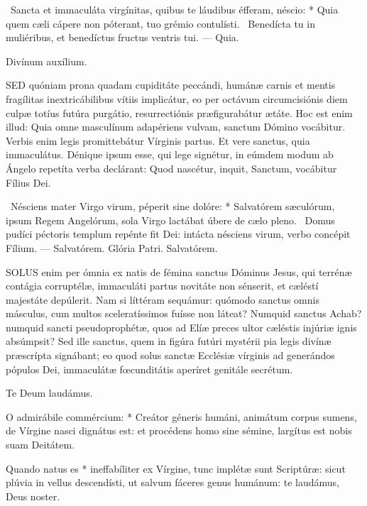 \R\ Sancta et immaculáta virgínitas, quibus te láudibus éfferam, néscio: * Quia quem cæli cápere non póterant, tuo grémio contulísti. \V\ Benedícta tu in muliéribus, et benedíctus fructus ventris tui. --- Quia.

 Divínum auxílium.


\lettrine[lines=2]{S}{ED} quóniam prona quadam cupiditáte peccándi, humánæ carnis et mentis fragílitas inextricábilibus vítiis implicátur, eo per octávum circumcisiónis diem culpæ totíus futúra purgátio, resurrectiónis præfigurabátur ætáte. Hoc est enim illud: Quia omne masculínum adapériens vulvam, sanctum Dómino vocábitur. Verbis enim legis promittebátur Vírginis partus. Et vere sanctus, quia immaculátus. Dénique ipsum esse, qui lege signétur, in eúmdem modum ab Ángelo repetíta verba declárant: Quod nascétur, inquit, Sanctum, vocábitur Fílius Dei.

\R\ Nésciens mater Virgo virum, péperit sine dolóre: * Salvatórem sæculórum, ipsum Regem Angelórum, sola Virgo lactábat úbere de cælo pleno. \V\ Domus pudíci péctoris templum repénte fit Dei: intácta nésciens virum, verbo concépit Fílium. --- Salvatórem. Glória Patri. Salvatórem.


\lettrine[lines=2]{S}{OLUS} enim per ómnia ex natis de fémina sanctus Dóminus Jesus, qui terrénæ contágia corruptélæ, immaculáti partus novitáte non sénserit, et cæléstí majestáte depúlerit. Nam si líttéram sequámur: quómodo sanctus omnis másculus, cum multos sceleratíssimos fuísse non láteat? Numquid sanctus Achab? numquid sancti pseudoprophétæ, quos ad Elíæ preces ultor cæléstis injúriæ ignis absúmpsit? Sed ille sanctus, quem in figúra futúri mystérii pia legis divínæ præscrípta signábant; eo quod solus sanctæ Ecclésiæ vírginis ad generándos pópulos Dei, immaculátæ fœcunditátis aperíret genitále secrétum.

 Te Deum laudámus.



 O admirábile commércium: * Creátor géneris humáni, animátum corpus sumens, de Vírgine nasci dignátus est: et procédens homo sine sémine, largítus est nobis suam Deitátem.


 Quando natus es * ineffabíliter ex Vírgine, tunc implétæ sunt Scriptúræ: sicut plúvia in vellus descendísti, ut salvum fáceres genus humánum: te laudámus, Deus noster.

